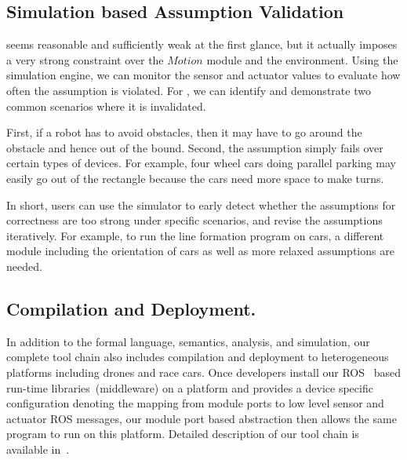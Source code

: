 \subsection{Simulation based Assumption Validation}

 seems reasonable and sufficiently weak at the first glance,
but it actually imposes a very strong constraint over the $Motion$ module and the environment.
Using the simulation engine, we can monitor the sensor and actuator values to evaluate how often the assumption is violated.
For , we can identify and demonstrate two common scenarios
where it is invalidated.

First, if a robot has to avoid obstacles,
then it may have to go around the obstacle and hence out of the bound.
Second, the assumption simply fails over certain types of devices.
For example, four wheel cars doing parallel parking may easily go out of the rectangle
because the cars need more space to make turns.

In short, users can use the simulator to early detect whether
the assumptions for correctness are too strong under specific scenarios,
and revise the assumptions iteratively.
For example, to run the line formation program on cars,
a different module including the orientation of cars as well as more relaxed assumptions are needed.

\subsection{Compilation and Deployment.}
In addition to the formal language, semantics, analysis, and simulation,
our complete tool chain also includes compilation and deployment to heterogeneous platforms including drones and race cars.
Once developers install our ROS~\cite{ros} based run-time libraries~(middleware) on a platform
and provides a device specific configuration denoting the mapping from \lgname module ports
to low level sensor and actuator ROS messages,
our module port based abstraction then allows the same \lgname program to run on this platform.
Detailed description of our tool chain is available in~\cite{ghosh2019cyphyhouse}.
